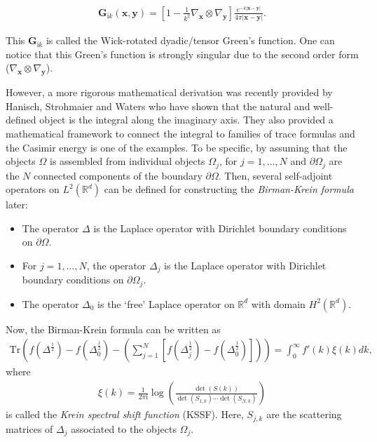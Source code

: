 \begin{align*}
    \boldsymbol{G}_{\mathrm{i}k}(\boldsymbol{x}, \boldsymbol{y}) = \left[1 - \frac{1}{k^{2}}\nabla_{\boldsymbol{x}}\otimes\nabla_{\boldsymbol{y}}\right]\frac{e^{-k|\boldsymbol{x} - \boldsymbol{y}|}}{4\pi|\boldsymbol{x} - \boldsymbol{y}|}.
\end{align*}

This $ \boldsymbol{G}_{\mathrm{i}k}$ is called the Wick-rotated dyadic/tensor Green's function. One can notice that this Green's function is strongly singular 
due to the second order form ($\nabla_{\boldsymbol{x}}\otimes\nabla_{\boldsymbol{y}}$). 



However, a more rigorous mathematical 
derivation was recently provided by Hanisch, Strohmaier and Waters \cite{hanisch2020relative} who have shown that the natural and well-defined object is the 
integral along the imaginary axis. They also provided a mathematical framework to connect the integral to families of trace formulas and the Casimir 
energy is one of the examples. To be specific, by assuming that the objects $\Omega$ is assembled from individual objects $\Omega_{j}$, for $j = 1, \dots, N$ and 
$\partial\Omega_{j}$ are the $N$ connected components of the boundary $\partial\Omega$. Then, several self-adjoint operators on $L^{2}(\mathbb{R}^{d})$
can be defined for constructing the \emph{Birman-Krein formula} later:
\begin{itemize}
    \item The operator $\Delta$ is the Laplace operator with Dirichlet boundary conditions on $\partial\Omega$.
    \item For $j = 1, \dots, N$, the operator $\Delta_{j}$ is the Laplace operator with Dirichlet boundary conditions on $\partial\Omega_{j}$.
    \item The operator $\Delta_{0}$ is the `free' Laplace operator on $\mathbb{R}^{d}$ with domain $H^{2}(\mathbb{R}^{d})$.
\end{itemize}

Now, the Birman-Krein formula can be written as 
\begin{align}\label{B-K formula}
    \text{Tr}\left(f(\Delta^{\frac{1}{2}}) - f(\Delta_{0}^{\frac{1}{2}}) - \left(\sum_{j = 1}^{N}[f(\Delta_{j}^{\frac{1}{2}}) - f(\Delta_{0}^{\frac{1}{2}})]\right)\right)  = \int_{0}^{\infty}f'(k)\xi(k)dk,
\end{align}
where 
\begin{align*}
    \xi(k) = \frac{1}{2\pi \mathrm{i}}\log\left(\frac{\det(S(k))}{\det(S_{1,k})\cdots\det(S_{N,k})}\right)
\end{align*}
is called the \emph{Krein spectral shift function} (KSSF). Here, $S_{j,k}$ are the scattering matrices of $\Delta_{j}$ associated to the objects $\Omega_{j}$.

